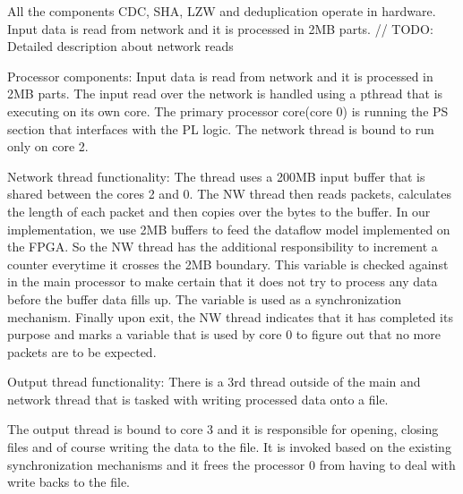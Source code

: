 \documentclass{article}
\begin{document}
All the components CDC, SHA, LZW and deduplication operate in hardware. 
Input data is read from network and it is processed in 2MB parts. 
// TODO: Detailed description about network reads
\newline\newline

Processor components:
\newline\newline
Input data is read from network and it is processed in 2MB parts. 
\newline
The input read over the network is handled using a pthread that is executing on its own core. 
\newline
The primary processor core(core 0) is running the PS section that interfaces with the PL logic. 
\newline
The network thread is bound to run only on core 2. 
\newline

Network thread functionality: 
\newline\newline
The thread uses a 200MB input buffer that is shared between the cores 2 and 0.
\newline
The NW thread then reads packets, calculates the length of each packet and then copies over the bytes to the buffer.
\newline
In our implementation, we use 2MB buffers to feed the dataflow model implemented on the FPGA.
\newline
So the NW thread has the additional responsibility to increment a counter everytime it crosses the 2MB boundary. 
This variable is checked against in the main processor to make certain that it does not try to process any data before the buffer data fills up. The variable is used as a synchronization mechanism.
\newline
Finally upon exit, the NW thread indicates that it has completed its purpose and marks a variable that is used by core 0 to figure out that no more packets are to be expected.
\newline

Output thread functionality:
\newline\newline
There is a 3rd thread outside of the main and network thread that is tasked with writing processed data onto a file. 
\par
The output thread is bound to core 3 and it is responsible for opening, closing files and of course writing the data to the file. 
It is invoked based on the existing synchronization mechanisms and it frees the processor 0 from having to deal with write backs to the file. 
\newline
\end{document}
